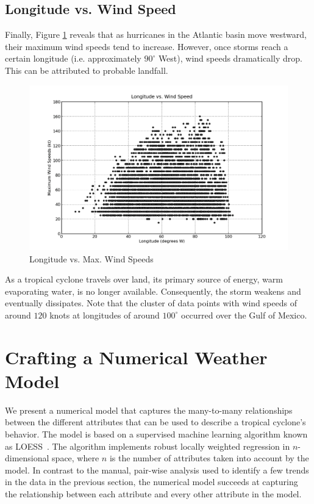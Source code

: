 \documentclass[letterpaper,twocolumn,10pt]{article}
\begin{document}
\subsection{Longitude vs. Wind Speed}
Finally, Figure \ref{longitude_vs_speed} reveals that as hurricanes in the
Atlantic basin move westward, their maximum wind speeds tend to increase.
However, once storms reach a certain longitude (i.e. approximately $90^\circ$
West), wind speeds dramatically drop. This can be attributed to probable
landfall.
\begin{figure}[h!]
  \centering
  \includegraphics[scale=0.31]{longitude_vs_speed.png}
  \caption{Longitude vs. Max. Wind Speeds}
  \label{longitude_vs_speed}
\end{figure}

As a tropical cyclone travels over land, its primary source of energy, warm
evaporating water, is no longer available. Consequently, the storm weakens and
eventually dissipates. Note that the cluster of data points with wind speeds of
around $120$ knots at longitudes of around $100^\circ$ occurred over the Gulf of
Mexico.

\section{Crafting a Numerical Weather Model}

We present a numerical model that captures the many-to-many relationships
between the different attributes that can be used to describe a tropical
cyclone's behavior. The model is based on a supervised machine learning
algorithm known as LOESS~\cite{LOESS}. The algorithm implements robust locally
weighted regression in $n$-dimensional space, where $n$ is the number of
attributes taken into account by the model. In contrast to the manual, pair-wise
analysis used to identify a few trends in the data in the previous section, the
numerical model succeeds at capturing the relationship between each attribute
and every other attribute in the model.
\end{document}

